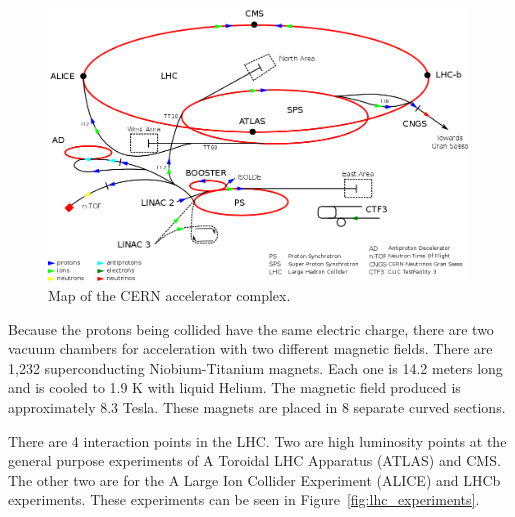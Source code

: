 \begin{figure}[htb]
\centering
\includegraphics[width=0.99\textwidth]{Experiment/1024px-Cern-accelerator-complex.png}
\caption{Map of the CERN accelerator complex.\cite{CERN_complex}}
\label{fig:lhc_schematic}
\end{figure}

Because the protons being collided have the same electric charge, there are two vacuum chambers for acceleration with two different magnetic fields. There are 1,232 superconducting Niobium-Titanium magnets. Each one is 14.2 meters long and is cooled to 1.9 K with liquid Helium. The magnetic field produced is approximately 8.3 Tesla. These magnets are placed in 8 separate curved sections.

There are 4 interaction points in the LHC.  Two are high luminosity points at the general purpose experiments of A Toroidal LHC Apparatus (ATLAS) \cite{ATLASExperiment} and CMS. The other two are for the A Large Ion Collider Experiment (ALICE) \cite{ALICEExperiment}  and LHCb \cite{LHCbExperiment} experiments. These experiments can be seen in Figure~\ref{fig:lhc_experiments}.









